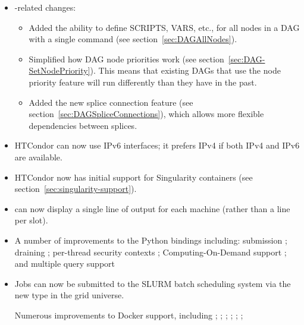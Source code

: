 \begin{itemize}
\begin{itemize}
  \end{itemize}

\item {}-related changes:
  \begin{itemize}

  \item Added the ability to define SCRIPTS, VARS, etc., for all nodes
  in a DAG with a single command (see section~\ref{sec:DAGAllNodes}).

  \item Simplified how DAG node priorities work
  (see section~\ref{sec:DAG-SetNodePriority}).
  This means that existing DAGs that use the node priority feature
  will run differently than they have in the past.

  \item Added the new splice connection feature
  (see section~\ref{sec:DAGSpliceConnections}), which
  allows more flexible dependencies between splices.

  \end{itemize}

\item HTCondor can now use IPv6 interfaces; it prefers IPv4 if both
IPv4 and IPv6 are available.

\item HTCondor now has initial support for Singularity containers
(see section~\ref{sec:singularity-support}).

\item {} can now display a single line of output for
each machine (rather than a line per slot).

\item A number of improvements to the Python bindings including: submission
;
draining
;
per-thread security contexts
;
Computing-On-Demand support
; and
multiple query support

\item Jobs can now be submitted to the SLURM batch scheduling system via
the new  type in the grid universe.

Numerous improvements to Docker support, including
;
;
;
;
;
;


\end{itemize}

